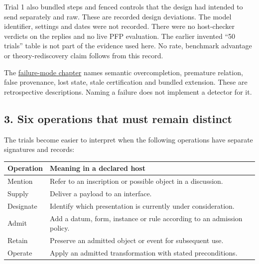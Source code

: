 \documentclass[
  11pt,
]{article}
\begin{document}
Trial 1 also bundled steps and fenced controls that the design had
intended to send separately and raw. These are recorded design
deviations. The model identifier, settings and dates were not recorded.
There were no host-checker verdicts on the replies and no live PFP
evaluation. The earlier invented ``50 trials'' table is not part of the
evidence used here. No rate, benchmark advantage or theory-rediscovery
claim follows from this record.

The
\href{docs/sources/pre_genesis/04_named_failure_modes.txt}{failure-mode
chapter} names semantic overcompletion, premature relation, false
provenance, lost state, stale certification and bundled extension. These
are retrospective descriptions. Naming a failure does not implement a
detector for it.

\subsection{3. Six operations that must remain
distinct}\label{six-operations-that-must-remain-distinct}

The trials become easier to interpret when the following operations have
separate signatures and records:

\begin{longtable}[]{@{}
  >{\raggedright\arraybackslash}p{}
  >{\raggedright\arraybackslash}p{}@{}}
\toprule\noalign{}
\begin{minipage}[b]{\linewidth}\raggedright
Operation
\end{minipage} & \begin{minipage}[b]{\linewidth}\raggedright
Meaning in a declared host
\end{minipage} \\
\midrule\noalign{}
\endhead
\bottomrule\noalign{}
\endlastfoot
Mention & Refer to an inscription or possible object in a discussion. \\
Supply & Deliver a payload to an interface. \\
Designate & Identify which presentation is currently under
consideration. \\
Admit & Add a datum, form, instance or rule according to an admission
policy. \\
Retain & Preserve an admitted object or event for subsequent use. \\
Operate & Apply an admitted transformation with stated preconditions. \\
\end{longtable}
\end{document}
